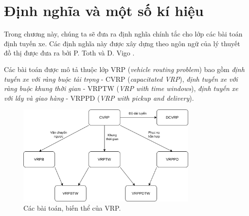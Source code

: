 \chapter{Định nghĩa và một số kí hiệu}
\label{chap:model}

Trong chương này, chúng ta sẽ đưa ra định nghĩa chính tắc cho lớp các bài toán định tuyến xe. Các định nghĩa này được xây dựng theo ngôn ngữ của lý thuyết đồ thị được đưa ra bởi P. Toth và D. Vigo \cite{toth2002vehicle}. 

Các bài toán được mô tả thuộc lớp VRP (\textit{vehicle routing problem}) bao gồm \textit{định tuyến xe với ràng buộc tải trọng} - CVRP (\textit{capacitated VRP}), \textit{định tuyến xe với ràng buộc khung thời gian} - VRPTW (\textit{VRP with time windows}), \textit{định tuyến xe với lấy và giao hàng} - VRPPD (\textit{VRP with pickup and delivery}).

\begin{figure}[H] %
  \centering %
  \includegraphics[width=0.8\textwidth]{figures/vrp.png} 
  \caption{Các bài toán, biến thể của VRP.} %
  \label{fig:fg_01}
\end{figure}


